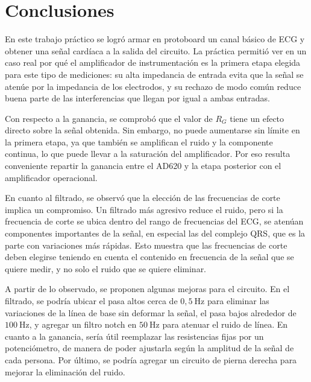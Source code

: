 \section{Conclusiones}

En este trabajo práctico se logró armar en protoboard un canal básico de ECG y obtener una señal cardíaca a la salida del circuito.
La práctica permitió ver en un caso real por qué el amplificador de instrumentación es la primera etapa elegida para este tipo de mediciones: su alta impedancia de entrada evita que la señal se atenúe por la impedancia de los electrodos, y su rechazo de modo común reduce buena parte de las interferencias que llegan por igual a ambas entradas.

Con respecto a la ganancia, se comprobó que el valor de $R_G$ tiene un efecto directo sobre la señal obtenida.
Sin embargo, no puede aumentarse sin límite en la primera etapa, ya que también se amplifican el ruido y la componente continua, lo que puede llevar a la saturación del amplificador.
Por eso resulta conveniente repartir la ganancia entre el AD620 y la etapa posterior con el amplificador operacional.

En cuanto al filtrado, se observó que la elección de las frecuencias de corte implica un compromiso.
Un filtrado más agresivo reduce el ruido, pero si la frecuencia de corte se ubica dentro del rango de frecuencias del ECG, se atenúan componentes importantes de la señal, en especial las del complejo QRS, que es la parte con variaciones más rápidas.
Esto muestra que las frecuencias de corte deben elegirse teniendo en cuenta el contenido en frecuencia de la señal que se quiere medir, y no solo el ruido que se quiere eliminar.

A partir de lo observado, se proponen algunas mejoras para el circuito.
En el filtrado, se podría ubicar el pasa altos cerca de $0{,}5~\mathrm{Hz}$ para eliminar las variaciones de la línea de base sin deformar la señal, el pasa bajos alrededor de $100~\mathrm{Hz}$, y agregar un filtro notch en $50~\mathrm{Hz}$ para atenuar el ruido de línea.
En cuanto a la ganancia, sería útil reemplazar las resistencias fijas por un potenciómetro, de manera de poder ajustarla según la amplitud de la señal de cada persona.
Por último, se podría agregar un circuito de pierna derecha para mejorar la eliminación del ruido.
